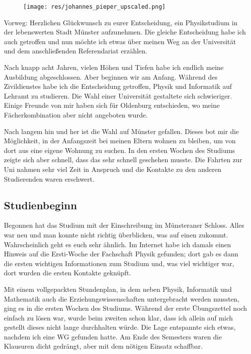 \begin{multicols*}{2}
\begin{wrapfigure}[10]{r}{0cm}
	\texttt{[image: res/johannes\_pieper\_upscaled.png]}
\end{wrapfigure}
Vorweg: Herzlichen Glückwunsch zu eurer Entscheidung, ein Physikstudium in der lebenswerten Stadt Münster aufzunehmen.
Die gleiche Entscheidung habe ich auch getroffen und nun möchte ich etwas über meinen Weg an der Universität und dem anschließenden Referendariat erzählen.

Nach knapp acht Jahren, vielen Höhen und Tiefen habe ich endlich meine Ausbildung abgeschlossen.
Aber beginnen wir am Anfang.
Während des Zivildienstes habe ich die Entscheidung getroffen, Physik und Informatik auf Lehramt zu studieren.
Die Wahl einer Universität gestaltete sich schwieriger.
Einige Freunde von mir haben sich für Oldenburg entschieden, wo meine Fächerkombination aber nicht angeboten wurde.

Nach langem hin und her ist die Wahl auf Münster gefallen.
Dieses bot mir die Möglichkeit, in der Anfangszeit bei meinen Eltern wohnen zu bleiben, um von dort aus eine eigene Wohnung zu suchen.
In den ersten Wochen des Studiums zeigte sich aber schnell, dass das sehr schnell geschehen musste.
Die Fahrten zur Uni nahmen sehr viel Zeit in Anspruch und die Kontakte zu den anderen Studierenden waren erschwert.

\subsection{Studienbeginn}
Begonnen hat das Studium mit der Einschreibung im Münsteraner Schloss.
Alles war neu und man konnte nicht richtig überblicken, was auf einen zukommt.
Wahrscheinlich geht es euch sehr ähnlich.
Im Internet habe ich damals einen Hinweis auf die Ersti-Woche der Fachschaft Physik gefunden; dort gab es dann die ersten wichtigen Informationen zum Studium und, was viel wichtiger war, dort wurden die ersten Kontakte geknüpft.

Mit einem vollgepackten Stundenplan, in dem neben Physik, Informatik und Mathematik auch die Erziehungswissenschaften untergebracht werden mussten, ging es in die ersten Wochen des Studiums.
Während der erste Übungszettel noch einfach zu lösen war, wurde beim zweiten schon klar, dass ich allein auf mich gestellt dieses nicht lange durchhalten würde.
Die Lage entspannte sich etwas, nachdem ich eine WG gefunden hatte.
Am Ende des Semesters waren die Klausuren dicht gedrängt, aber mit dem nötigen Einsatz schaffbar.


\end{multicols*}
